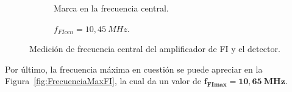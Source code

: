     \begin{figure}[H]
      \centering
      \begin{subfigure}[ht]{0.48\textwidth}
        \caption{Marca en la frecuencia central.}
        \label{fig:FrecuenciaCenFI_Osc}
      \end{subfigure}
      \hfill 
      \begin{subfigure}[ht]{0.48\textwidth}
        \caption{$f_{FIcen} = 10,45~MHz$.}
        \label{fig:FrecuneciaCenFI_Gener}
      \end{subfigure}

      \caption{Medición de frecuencia central del amplificador de FI y el detector.}
      \label{fig:FrecuenciaCenFI}
    \end{figure}

    Por último, la frecuencia máxima en cuestión se puede apreciar en la Figura~\ref{fig:FrecuenciaMaxFI}, 
    la cual da un valor de $\mathbf{f_{FImax} = 10,65~MHz}$.

